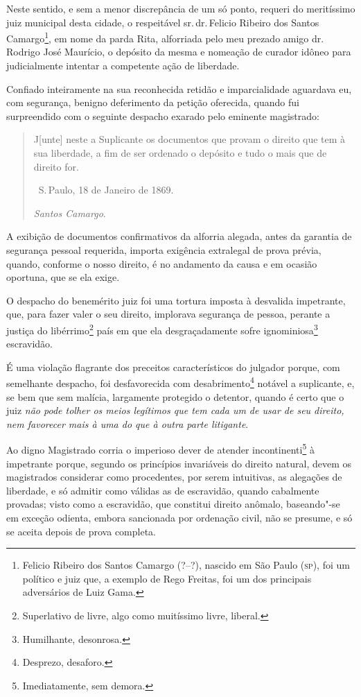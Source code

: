 Neste sentido, e sem a menor discrepância de um só ponto, requeri do
meritíssimo juiz municipal desta cidade, o respeitável sr.\,dr.\,Felicio
Ribeiro dos Santos Camargo\footnote{Felicio Ribeiro dos Santos Camargo
  (?--?), nascido em São Paulo (\textsc{sp}), foi um político e juiz que, a
  exemplo de Rego Freitas, foi um dos principais adversários de Luiz
  Gama.}, em nome da parda Rita, alforriada pelo meu prezado amigo dr.\,Rodrigo José Maurício, o depósito da mesma e nomeação de curador idôneo
para judicialmente intentar a competente ação de liberdade.

Confiado inteiramente na sua reconhecida retidão e imparcialidade
aguardava eu, com segurança, benigno deferimento da petição oferecida,
quando fui surpreendido com o seguinte despacho exarado pelo eminente
magistrado:

\begin{quote}
J{[}unte{]} neste a Suplicante os documentos que provam o direito que
tem à sua liberdade, a fim de ser ordenado o depósito e tudo o mais que
de direito for.

\hfill\ S.\,Paulo, 18 de Janeiro de 1869.

\hfill\emph{Santos Camargo}.
\end{quote}

A exibição de documentos confirmativos da alforria alegada, antes da
garantia de segurança pessoal requerida, importa exigência extralegal de
prova prévia, quando, conforme o nosso direito, é no andamento da causa
e em ocasião oportuna, que se ela exige.

O despacho do benemérito juiz foi uma tortura imposta à desvalida
impetrante, que, para fazer valer o seu direito, implorava segurança de
pessoa, perante a justiça do libérrimo\footnote{Superlativo de livre, \label{liberrimo}
  algo como muitíssimo livre, liberal.} país em que ela
desgraçadamente sofre ignominiosa\footnote{Humilhante, desonrosa.}
escravidão.

É uma violação flagrante dos preceitos característicos do julgador
porque, com semelhante despacho, foi desfavorecida com
desabrimento\footnote{Desprezo, desaforo.} notável a suplicante, e, se
bem que sem malícia, largamente protegido o detentor, quando é certo que
o juiz \emph{não pode tolher os meios legítimos que tem cada um de usar
de seu direito, nem favorecer mais à uma do que à outra parte
litigante}.

Ao digno Magistrado corria o imperioso dever de atender
incontinenti\footnote{Imediatamente, sem demora.} à impetrante porque,
segundo os princípios invariáveis do direito natural, devem os
magistrados considerar como procedentes, por serem intuitivas, as
alegações de liberdade, e só admitir como válidas as de escravidão,
quando cabalmente provadas; visto como a escravidão, que constitui
direito anômalo, baseando"-se em exceção odienta, embora sancionada por
ordenação civil, não se presume, e só se aceita depois de prova
completa.

